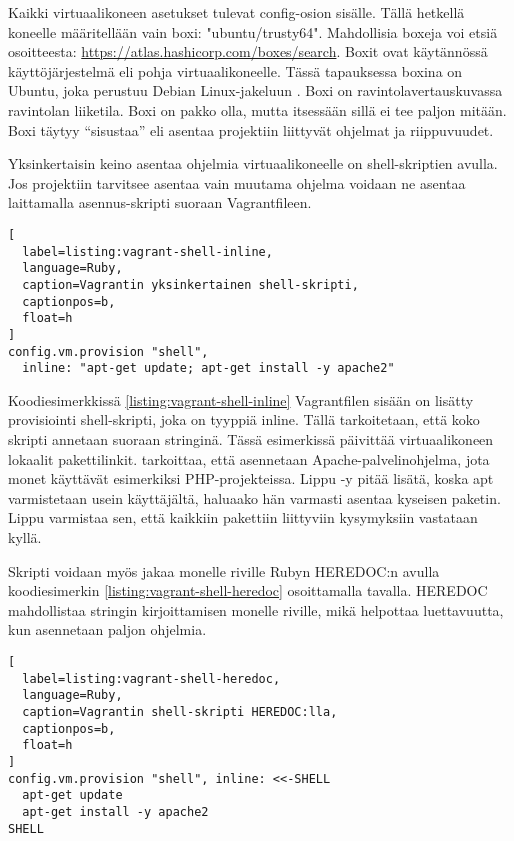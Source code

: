 Kaikki virtuaalikoneen asetukset tulevat config-osion sisälle. Tällä hetkellä koneelle määritellään vain boxi: "ubuntu/trusty64". Mahdollisia boxeja voi etsiä osoitteesta: \url{https://atlas.hashicorp.com/boxes/search}. Boxit ovat käytännössä käyttöjärjestelmä eli pohja virtuaalikoneelle. Tässä tapauksessa boxina on Ubuntu, joka perustuu Debian Linux-jakeluun \cite{link:ubuntu}. Boxi on ravintolavertauskuvassa ravintolan liiketila. Boxi on pakko olla, mutta itsessään sillä ei tee paljon mitään. Boxi täytyy \enquote{sisustaa} eli asentaa projektiin liittyvät ohjelmat ja riippuvuudet.

Yksinkertaisin keino asentaa ohjelmia virtuaalikoneelle on shell-skriptien avulla. Jos projektiin tarvitsee asentaa vain muutama ohjelma voidaan ne asentaa laittamalla asennus-skripti suoraan Vagrantfileen. 

\begin{lstlisting}[
  label=listing:vagrant-shell-inline,
  language=Ruby,
  caption=Vagrantin yksinkertainen shell-skripti,
  captionpos=b,
  float=h
]
config.vm.provision "shell",
  inline: "apt-get update; apt-get install -y apache2"
\end{lstlisting}

Koodiesimerkkissä \ref{listing:vagrant-shell-inline} Vagrantfilen sisään on lisätty provisiointi shell-skripti, joka on tyyppiä inline. Tällä tarkoitetaan, että koko skripti annetaan suoraan stringinä. Tässä esimerkissä  päivittää virtuaalikoneen lokaalit pakettilinkit.  tarkoittaa, että asennetaan Apache-palvelinohjelma, jota monet käyttävät esimerkiksi PHP-projekteissa. Lippu -y pitää lisätä, koska apt varmistetaan usein käyttäjältä, haluaako hän varmasti asentaa kyseisen paketin. Lippu varmistaa sen, että kaikkiin pakettiin liittyviin kysymyksiin vastataan kyllä.

Skripti voidaan myös jakaa monelle riville Rubyn HEREDOC:n avulla koodiesimerkin \ref{listing:vagrant-shell-heredoc} osoittamalla tavalla. HEREDOC \cite{link:ruby-heredoc} mahdollistaa stringin kirjoittamisen monelle riville, mikä helpottaa luettavuutta, kun asennetaan paljon ohjelmia.

\begin{lstlisting}[
  label=listing:vagrant-shell-heredoc,
  language=Ruby,
  caption=Vagrantin shell-skripti HEREDOC:lla,
  captionpos=b,
  float=h
]
config.vm.provision "shell", inline: <<-SHELL
  apt-get update
  apt-get install -y apache2
SHELL
\end{lstlisting}

